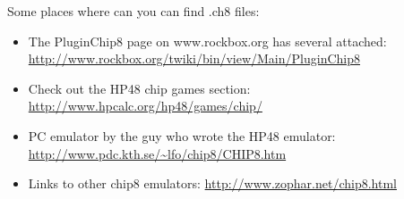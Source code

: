 Some places where can you can find .ch8 files:
\begin{itemize}
\item The PluginChip8 page on www.rockbox.org has several attached:
\url{http://www.rockbox.org/twiki/bin/view/Main/PluginChip8}
\item Check out the HP48 chip games section:
\url{http://www.hpcalc.org/hp48/games/chip/}
\item PC emulator by the guy who wrote the HP48 emulator:
\url{http://www.pdc.kth.se/~lfo/chip8/CHIP8.htm}
\item Links to other chip8 emulators: 
\url{http://www.zophar.net/chip8.html}
\end{itemize}
